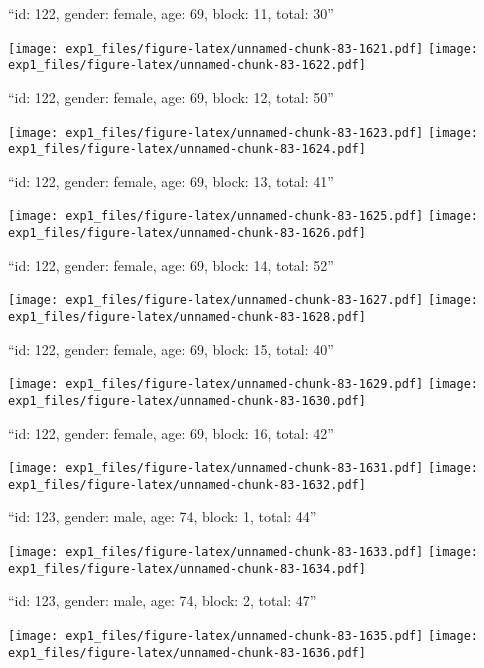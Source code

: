 \documentclass[11pt,,]{article}
\begin{document}
\newpage
[1] 

``id: 122, gender: female, age: 69, block: 11, total: 30''

\texttt{[image: exp1\_files/figure-latex/unnamed-chunk-83-1621.pdf]}
\texttt{[image: exp1\_files/figure-latex/unnamed-chunk-83-1622.pdf]}

\newpage
[1] 

``id: 122, gender: female, age: 69, block: 12, total: 50''

\texttt{[image: exp1\_files/figure-latex/unnamed-chunk-83-1623.pdf]}
\texttt{[image: exp1\_files/figure-latex/unnamed-chunk-83-1624.pdf]}

\newpage
[1] 

``id: 122, gender: female, age: 69, block: 13, total: 41''

\texttt{[image: exp1\_files/figure-latex/unnamed-chunk-83-1625.pdf]}
\texttt{[image: exp1\_files/figure-latex/unnamed-chunk-83-1626.pdf]}

\newpage
[1] 

``id: 122, gender: female, age: 69, block: 14, total: 52''

\texttt{[image: exp1\_files/figure-latex/unnamed-chunk-83-1627.pdf]}
\texttt{[image: exp1\_files/figure-latex/unnamed-chunk-83-1628.pdf]}

\newpage
[1] 

``id: 122, gender: female, age: 69, block: 15, total: 40''

\texttt{[image: exp1\_files/figure-latex/unnamed-chunk-83-1629.pdf]}
\texttt{[image: exp1\_files/figure-latex/unnamed-chunk-83-1630.pdf]}

\newpage
[1] 

``id: 122, gender: female, age: 69, block: 16, total: 42''

\texttt{[image: exp1\_files/figure-latex/unnamed-chunk-83-1631.pdf]}
\texttt{[image: exp1\_files/figure-latex/unnamed-chunk-83-1632.pdf]}

\newpage
[1] 

``id: 123, gender: male, age: 74, block: 1, total: 44''

\texttt{[image: exp1\_files/figure-latex/unnamed-chunk-83-1633.pdf]}
\texttt{[image: exp1\_files/figure-latex/unnamed-chunk-83-1634.pdf]}

\newpage
[1] 

``id: 123, gender: male, age: 74, block: 2, total: 47''

\texttt{[image: exp1\_files/figure-latex/unnamed-chunk-83-1635.pdf]}
\texttt{[image: exp1\_files/figure-latex/unnamed-chunk-83-1636.pdf]}
\end{document}
